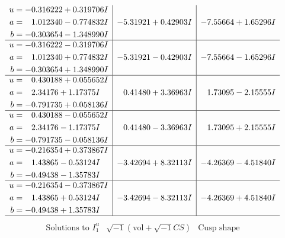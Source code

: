 \documentclass[1p]{elsarticle_modified}
\theoremstyle{definition}
\newcommand{\I}{\sqrt{-1}}
\begin{document}
$$\begin{array}{c|c|c}
\begin{aligned}
u &= -0.316222 + 0.319706 I \\
a &= \phantom{-}1.012340 - 0.774832 I \\
b &= -0.303654 - 1.348990 I\end{aligned}
 & -5.31921 + 0.42903 I & -7.55664 + 1.65296 I \\ \hline\begin{aligned}
u &= -0.316222 - 0.319706 I \\
a &= \phantom{-}1.012340 + 0.774832 I \\
b &= -0.303654 + 1.348990 I\end{aligned}
 & -5.31921 - 0.42903 I & -7.55664 - 1.65296 I \\ \hline\begin{aligned}
u &= \phantom{-}0.430188 + 0.055652 I \\
a &= \phantom{-}2.34176 + 1.17375 I \\
b &= -0.791735 + 0.058136 I\end{aligned}
 & \phantom{-}0.41480 + 3.36963 I & \phantom{-}1.73095 - 2.15555 I \\ \hline\begin{aligned}
u &= \phantom{-}0.430188 - 0.055652 I \\
a &= \phantom{-}2.34176 - 1.17375 I \\
b &= -0.791735 - 0.058136 I\end{aligned}
 & \phantom{-}0.41480 - 3.36963 I & \phantom{-}1.73095 + 2.15555 I \\ \hline\begin{aligned}
u &= -0.216354 + 0.373867 I \\
a &= \phantom{-}1.43865 - 0.53124 I \\
b &= -0.49438 - 1.35783 I\end{aligned}
 & -3.42694 + 8.32113 I & -4.26369 - 4.51840 I \\ \hline\begin{aligned}
u &= -0.216354 - 0.373867 I \\
a &= \phantom{-}1.43865 + 0.53124 I \\
b &= -0.49438 + 1.35783 I\end{aligned}
 & -3.42694 - 8.32113 I & -4.26369 + 4.51840 I\\
 \hline 
 \end{array}$$\newpage$$\begin{array}{c|c|c}  
\text{Solutions to }I^u_{1}& \I (\text{vol} + \sqrt{-1}CS) & \text{Cusp shape}\\
 \hline 
\begin{aligned}

\end{aligned}
\end{array}$$
\end{document}
